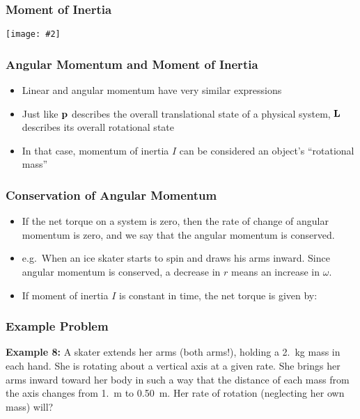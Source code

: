 \documentclass[12pt,compress,aspectratio=169]{beamer}
\newcommand{\pic}[2]{\texttt{[image: \#2]}}
\newcommand{\mb}[1]{\ensuremath\mathbf{#1}}
\newcommand{\eq}[2]{\vspace{#1}{\Large\begin{displaymath}#2\end{displaymath}}}
\begin{document}
\begin{frame}
  \frametitle{Moment of Inertia}
  \begin{center}
    \pic{.7}{mic.png}
  \end{center}
\end{frame}

\begin{frame}
  \frametitle{Angular Momentum and Moment of Inertia}
  \begin{itemize}
  \item Linear and angular momentum have very similar expressions
    
    \eq{-.25in}{
      \mb{p}=m\mb{v}\quad\quad\quad \mb{L}=I\bm{\omega}
    }
  \item Just like $\mb{p}$ describes the overall translational state of a
    physical system, $\mb{L}$ describes its overall rotational state
  \item In that case, momentum of inertia $I$ can be considered an object's
    ``rotational mass''
  \end{itemize}
\end{frame}



\begin{frame}
  \frametitle{Conservation of Angular Momentum}

  \eq{-.35in}{
    \bm{\tau}=\mb{r}\times\mb{F}=\mb{r}\times\frac{d\mb{p}}{dt}
    =\frac{d(\mb{r}\times\mb{p})}{dt}\;\;\longrightarrow\;\;
    \boxed{\bm{\tau} =\frac{d\mb{L}}{dt}}
  }
  \begin{itemize}
  \item If the net torque on a system is zero, then the rate of change
    of angular momentum is zero, and we say that the angular momentum is
    conserved. 
  \item e.g.\ When an ice skater starts to spin and draws his arms inward.
    Since angular momentum is conserved, a decrease in $r$ means an
    increase in $\omega$.
  \item If moment of inertia $I$ is constant in time, the net torque is given
    by:

    \eq{-.2in}{
      \boxed{\bm{\tau}=I\bm{\alpha}}
    }
  \end{itemize}
\end{frame}


\begin{frame}
  \frametitle{Example Problem}
  \textbf{Example 8:} A skater extends her arms (both arms!), holding a
  \SI{2.}{\kg} mass in each hand. She is rotating about a vertical axis at a
  given rate. She brings her arms inward toward her body in such a way that
  the distance of each mass from the axis changes from \SI{1.}{\metre} to
  \SI{.50}{\metre}. Her rate of rotation (neglecting her own mass) will?
\end{frame}
\end{document}
